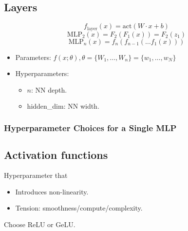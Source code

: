 \subsection{Layers}
\begin{definition}
    \begin{equation*}
        f_{\text{layer}}(x) = \text{act}(W \cdot x + b)
    \end{equation*}
    \begin{equation*}
        \text{MLP}_2(x) = F_2(F_1(x)) = F_2(z_1)
    \end{equation*}
    \begin{equation*}
        \text{MLP}_n(x) = f_n(f_{n-1}(\dots f_1(x)))
    \end{equation*}

    \begin{itemize}
        \item Parameters: $f(x; \theta), \theta = \{W_1, \dots, W_n\} = \{w_1, \dots, w_N\}$
        \item Hyperparameters: 
        \begin{itemize}
            \item $n$: NN depth.
            \item hidden\_dim: NN width.
        \end{itemize}
    \end{itemize}
\end{definition}

\subsubsection{Hyperparameter Choices for a Single MLP}
\begin{notes}
\end{notes}

\subsection{Activation functions}
\begin{definition}
    Hyperparameter that 
    \begin{itemize}
        \item Introduces non-linearity.
        \item Tension: smoothness/compute/complexity.
    \end{itemize}
\end{definition}

\begin{warning}
    Choose ReLU or GeLU.
\end{warning}

